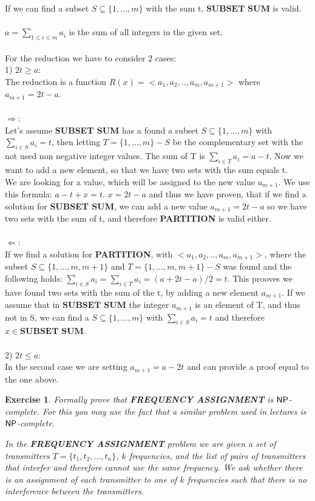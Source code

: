 \documentclass [11pt]{article}
\newtheorem{exercise}[theorem]{Exercise}
\newcommand{\ccfont}[1]{\protect\mathsf{#1}}
\newcommand{\NP}{\ccfont{NP}}
\begin{document}
If we can find a subset $S \subseteq \{1,..., m\}$ with the sum t, $\textbf{SUBSET SUM}$ is valid.\\
\\
$a = \sum_{1\leqslant i \leqslant m}a_i$ is the sum of all integers in the given set.\\
\\
For the reduction we have to consider 2 cases:\\
1) $2t \geqslant a$:\\
The reduction is a function $R(x) = < a_1, a_2, .. , a_m, a_{m+1} >$ where $a_{m+1} = 2t - a$.\\
\\
$\Rightarrow$:\\
Let's assume \textbf{SUBSET SUM} has a found a subset $S \subseteq \{1,..., m\}$ with $\sum_{i\in S} a_i = t$,
then letting $T = \{1,..., m\} - S$ be the complementary set with the not used non negative integer values.
The sum of T is $\sum_{i\in T} a_i = a - t$. Now we want to add a new element, so that we have two sets with the
sum equals t.\\
We are looking for a value, which will be assigned to the new value $a_{m+1}$. We use this formula: $a - t + x = t$.
$x = 2t - a$ and thus we have proven, that if we find a solution for \textbf{SUBSET SUM}, we can add a new value
$a_{m+1} = 2t - a$ so we have two sets with the sum of t, and therefore \textbf{PARTITION} is valid either.\\
\\
$\Leftarrow$:\\
If we find a solution for \textbf{PARTITION}, with $<a_1, a_2, .. , a_m, a_{m+1}>$, where the subset $S \subseteq \{1,..., m, m+1\}$
and $T = \{1,..., m, m+1\} - S$ was found and the following holds: $\sum_{i\in S} a_i = \sum_{i\in T} a_i = (a + 2t - a)/2 = t$.
This prooves we have found two sets with the sum of the t, by adding a new element $a_{m+1}$. If we assume that in 
$\textbf{SUBSET SUM}$ the integer $a_{m+1}$ is an element of T, and thus not in S, we can find a $S \subseteq \{1,..., m\}$
with $\sum_{i\in S} a_i = t$ and therefore $x \in \textbf{SUBSET SUM}$.\\
\\
2) $2t \leqslant a$:\\
In the second case we are setting $a_{m+1} = a - 2t$ and can provide a proof equal to the one above.


\begin{exercise}
  \label{ex:frequency}
  Formally prove that \textbf{FREQUENCY ASSIGNMENT} is $\NP$-complete. For this you may use
  the fact that a similar problem used in lectures is $\NP$-complete.
      
    \smallskip
        
  \noindent In the \textbf{FREQUENCY ASSIGNMENT} problem we are given a set of transmitters $T=\{t_1, t_2, \ldots, t_n\}$,  $k$ frequencies, and the list of pairs of transmitters that interfer and therefore cannot use the same frequency. We ask whether there is an assignment of each transmitter to one of $k$ frequencies such that there is no interference between the transmitters. 
            
\end{exercise}
\end{document}
